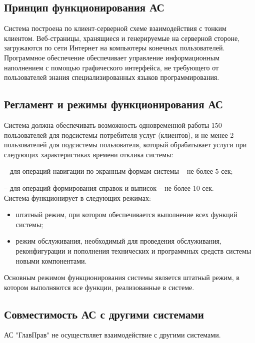 \documentclass[russian, utf8, 12pt,pointsubsection,floatsubsection]{eskdtext}
\begin{document}
\subsection{Принцип функционирования АС}
Система построена по клиент-серверной схеме взаимодействия с тонким клиентом. Веб-страницы, хранящиеся и генерируемые на серверной стороне, загружаются по сети Интернет на компьютеры конечных пользователей. \\

Программное обеспечение обеспечивает управление информационным наполнением с
помощью графического интерфейса, не требующего от пользователей знания
специализированных языков программирования.\\

\subsection{Регламент и режимы функционирования АС}
Система должна обеспечивать возможность одновременной работы 150 пользователей для подсистемы потребителя услуг (клиентов), и не менее 2 пользователей для подсистемы пользователя, который обрабатывает услуги при следующих характеристиках времени отклика системы:

– для операций навигации по экранным формам системы – не более 5 сек;

– для операций формирования справок и выписок – не более 10 сек.\\


Система функционирует в следующих режимах:
\begin{itemize}
    \item штатный режим, при котором обеспечивается выполнение всех функций системы;
    \item режим обслуживания, необходимый для проведения обслуживания, реконфигурации и пополнения технических и программных средств системы новыми компонентами.
\end{itemize}
Основным режимом функционирования системы является штатный режим, в котором
выполняются все функции, реализованные в системе.

\subsection{Совместимость АС с другими системами}
АС "ГлавПрав" не осуществляет взаимодействие с другими системами.
\end{document}
